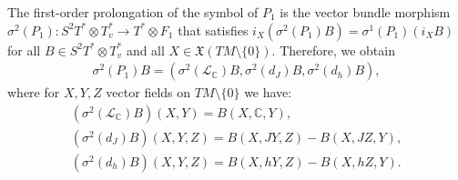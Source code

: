 The f\/irst-order prolongation of the symbol of $P_1$ is the vector
bundle morphism $\sigma^2(P_1): S^2T^*\otimes T^*_v \to T^*\otimes
F_1$ that satisf\/ies
$i_X\left(\sigma^2(P_1)B\right)=\sigma^1(P_1)(i_XB)$ for all $B\in
S^2T^*\otimes T^*_v$ and all $X\in {\mathfrak
X}(TM\setminus\{0\})$. Therefore, we obtain
\begin{gather*}
\sigma^2(P_1)B=\left( \sigma^2\left(\mathcal{L}_{\mathbb
C}\right)B, \sigma^2\left(d_J\right)B,
\sigma^2\left(d_h\right)B\right),
\end{gather*} where  for $X, Y, Z$ vector f\/ields on
$TM\setminus\{0\}$ we have:
\begin{gather} \nonumber \left(\sigma^2\left(\mathcal{L}_{\mathbb
C}\right)B\right)(X,Y)   =   B(X, \mathbb{C}, Y), \\
\label{sigma2p1} \left(\sigma^2\left(d_J\right)B\right)(X,Y,Z)   =
B(X, JY,Z)-B(X,JZ,Y), \\
\nonumber \left(\sigma^2\left(d_h\right)B\right)(X,Y,Z)   =
B(X,hY,Z)-B(X,hZ, Y).
\end{gather}

